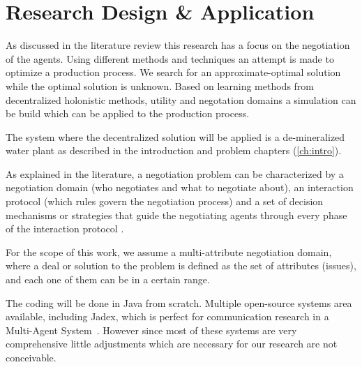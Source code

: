 \chapter{Research Design \& Application}
\label{ch:design}
As discussed in the literature review this research has a focus on the negotiation of the agents. Using different methods and techniques an attempt is made to optimize a production process. We search for an approximate-optimal solution while the optimal solution is unknown. Based on learning methods from decentralized holonistic methods, utility and negotation domains a simulation can be build which can be applied to the production process. 

The system where the  decentralized solution will be applied is a de-mineralized water plant as described in the introduction and problem chapters (\cref{ch:intro}).

As explained in the literature, a negotiation problem can be characterized by a negotiation domain (who negotiates and what to negotiate about), an interaction protocol (which rules govern the negotiation process) and a set of decision mechanisms or strategies that guide the negotiating agents through every phase of the interaction protocol \cite{fatima2014principles}.

For the scope of this work, we assume a multi-attribute negotiation domain, where a deal or solution to the problem is defined as the set of attributes (issues), and each one of them can be in a certain range.

The coding will be done in Java from scratch. Multiple open-source systems area available, including Jadex, which is perfect for communication research in a Multi-Agent System~\cite{kravari2015survey}. However since most of these systems are very comprehensive little adjustments which are necessary for our research are not conceivable.

